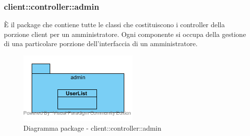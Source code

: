 \vspace{0.5cm}
\subsubsection{client::controller::admin}
È il package che contiene tutte le classi che costituiscono i controller della porzione client per un amministratore. Ogni componente si occupa della gestione di una particolare porzione dell'interfaccia di un amministratore.\begin{center}
	\begin{figure}[H]
		\centering \includegraphics[scale=4, max width=\textwidth, max height=\myheight]{../img/diagrammiClassi/client/controller/admin.png}
		\caption{Diagramma package - client::controller::admin}
	\end{figure}
\end{center}\hypertarget{client::controller::admin::UsersList}{}
